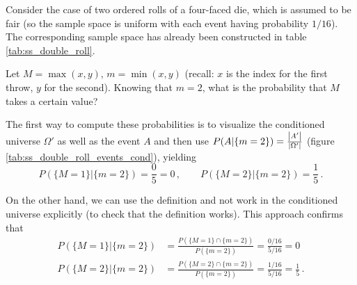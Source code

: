 \begin{ex}\label{ex:four_faced_die}
Consider the case of two ordered rolls of a four-faced die, which is assumed to be fair (so the sample space is uniform with each event having probability $1 / 16$). The corresponding sample space has already been constructed in table \ref{tab:ss_double_roll}.

Let $M = \max(x, y), \, m = \min(x, y)$ (recall: $x$ is the index for the first throw, $y$ for the second). Knowing that $m = 2$, what is the probability that $M$ takes a certain value?%

The first way to compute these probabilities is to visualize the conditioned universe $\Omega'$ as well as the event $A$ and then use $P(A | \{m = 2\}) = \frac{\abs{A'}}{\abs{\Omega'}}$ (figure \ref{tab:ss_double_roll_events_cond}), yielding
\begin{equation*}
P(\{M = 1\} | \{m = 2\}) = \frac{0}{5} = 0 \, , \qquad P(\{M = 2\} | \{m = 2\}) = \frac{1}{5} \, .
\end{equation*}


On the other hand, we can use the definition and not work in the conditioned universe explicitly (to check that the definition works). This approach confirms that
\begin{align*}
P(\{M = 1\} | \{m = 2\}) &= \frac{P(\{M = 1\} \cap \{m = 2\})}{P(\{m = 2\})} = \frac{0 / 16}{5 / 16} = 0
\\
P(\{M = 2\} | \{m = 2\}) &= \frac{P(\{M = 2\} \cap \{m = 2\})}{P(\{m = 2\})} = \frac{1 / 16}{5 / 16} = \frac{1}{5} \, .
\end{align*}
\end{ex}



